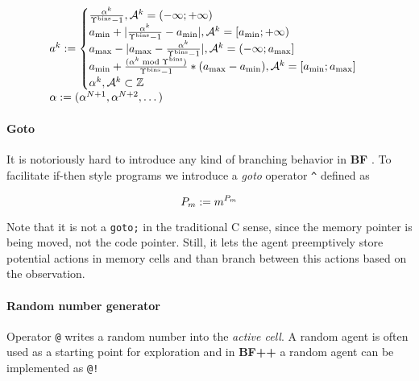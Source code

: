 \begin{equation}
\label{eq:act}
\begin{array}{l}
    a^k := \begin{cases}
\frac{\alpha^k}{\Upsilon^\text{bins}-1}, \mathcal{A}^k = (- \infty; + \infty) \\
a_{\text{min}} + |\frac{\alpha^k}{\Upsilon^\text{bins}-1} - a_{\text{min}}|, \mathcal{A}^k = [a_{\text{min}}; + \infty) \\
a_{\text{max}} - |a_{\text{max}} - \frac{\alpha^k}{\Upsilon^\text{bins}-1}|, \mathcal{A}^k = (- \infty; a_{\text{max}}] \\
a_{\text{min}} + \frac{(\alpha^k \bmod \Upsilon^\text{bins})}{\Upsilon^\text{bins} - 1} * (a_{\text{max}} - a_{\text{min}}), \mathcal{A}^k = [a_{\text{min}}; a_{\text{max}}] \\
\alpha^k, \mathcal{A}^k \subset \mathbb{Z}
\end{cases} \\
    \alpha := (\alpha^{N+1}, \alpha^{N+2}, \dots)
\end{array}
\end{equation}

\paragraph{Goto}
\label{sec:goto}

It is notoriously hard to introduce any kind of branching behavior in \textbf{BF} \cite{linanderControlFlowBrainfuck2016}.
To facilitate if-then style programs we introduce a \textit{goto} operator \verb|^| defined as 

\begin{equation}
   P_m := m^{P_m} 
\end{equation}

Note that it is not a \texttt{goto;} in the traditional C sense, since the memory pointer is being moved, not the code pointer.
Still, it lets the agent preemptively store potential actions in memory cells and than branch between this actions based on the observation.

\paragraph{Random number generator}
\label{sec:random}

Operator \texttt{@} writes a random number into the \textit{active cell}.
A random agent is often used as a starting point for exploration and in \textbf{BF++} a random agent can be implemented as \verb|@!|


